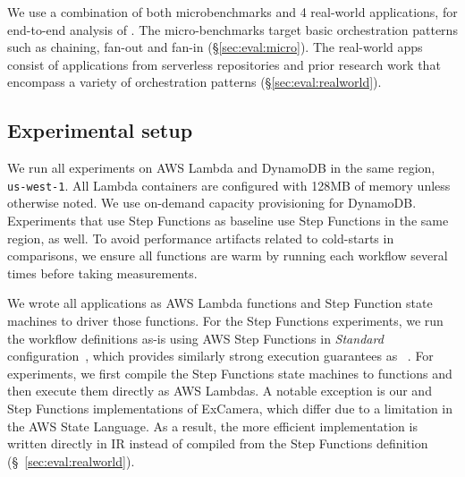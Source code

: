 


We use a combination of both microbenchmarks and 4 real-world applications,
for end-to-end analysis of \name{}. The micro-benchmarks target basic
orchestration patterns such as chaining, fan-out and fan-in
(\S\ref{sec:eval:micro}). The real-world apps consist of applications from
serverless repositories and prior research work  that encompass a variety of
orchestration patterns (\S\ref{sec:eval:realworld}).


\subsection{Experimental setup}

We run all experiments on AWS Lambda and DynamoDB in the same region,
\texttt{us-west-1}. All Lambda containers are configured with 128MB of memory
unless otherwise noted. We use on-demand capacity provisioning for DynamoDB.
Experiments that use Step Functions as baseline use Step Functions in the same
region, as well. To avoid performance artifacts related to cold-starts in
comparisons, we ensure all functions are warm by running each workflow several
times before taking measurements.

We wrote all applications as AWS Lambda functions and Step Function state
machines to driver those functions.  For the Step Functions experiments, we run
the workflow definitions as-is using AWS Step Functions in \emph{Standard}
configuration~\cite{aws-step-functions-standard-vs-express}, which provides
similarly strong execution guarantees as
\name{}~\cite{aws-step-functions-exec-gntee}. For \name{} experiments, we first
compile the Step Functions state machines to \name{} functions and then execute
them directly as AWS Lambdas. A notable exception is our \name{} and Step
Functions implementations of ExCamera, which differ due to a limitation in the
AWS State Language. As a result, the more efficient \name{} implementation is
written directly in \name{} IR instead of compiled from the Step Functions
definition (\S~\ref{sec:eval:realworld}).

